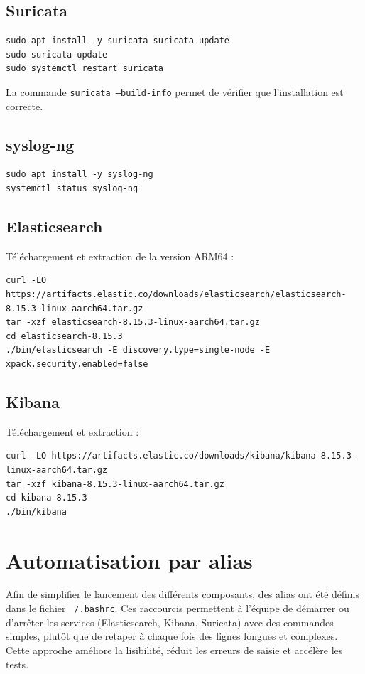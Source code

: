 \subsection*{Suricata}
\begin{verbatim}
sudo apt install -y suricata suricata-update
sudo suricata-update
sudo systemctl restart suricata
\end{verbatim}
La commande \texttt{suricata --build-info} permet de vérifier que l’installation est correcte.

\subsection*{syslog-ng}
\begin{verbatim}
sudo apt install -y syslog-ng
systemctl status syslog-ng
\end{verbatim}

\subsection*{Elasticsearch}
Téléchargement et extraction de la version ARM64 :
\begin{lstlisting}[style=bashstyle]
curl -LO https://artifacts.elastic.co/downloads/elasticsearch/elasticsearch-8.15.3-linux-aarch64.tar.gz
tar -xzf elasticsearch-8.15.3-linux-aarch64.tar.gz
cd elasticsearch-8.15.3
./bin/elasticsearch -E discovery.type=single-node -E xpack.security.enabled=false
\end{lstlisting}

\subsection*{Kibana}
Téléchargement et extraction :
\begin{lstlisting}[style=bashstyle]
curl -LO https://artifacts.elastic.co/downloads/kibana/kibana-8.15.3-linux-aarch64.tar.gz
tar -xzf kibana-8.15.3-linux-aarch64.tar.gz
cd kibana-8.15.3
./bin/kibana
\end{lstlisting}

\section{Automatisation par alias}
Afin de simplifier le lancement des différents composants, des alias ont été définis dans le fichier \texttt{~/.bashrc}. 
Ces raccourcis permettent à l’équipe de démarrer ou d’arrêter les services (Elasticsearch, Kibana, Suricata) avec des commandes simples, 
plutôt que de retaper à chaque fois des lignes longues et complexes. 
Cette approche améliore la lisibilité, réduit les erreurs de saisie et accélère les tests.